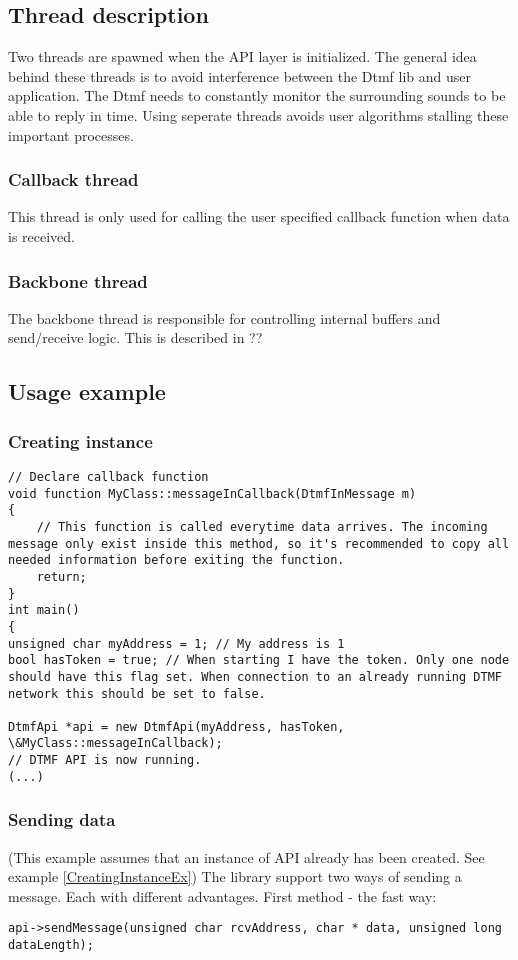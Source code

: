 \subsection{Thread description}
Two threads are spawned when the API layer is initialized. The general idea behind these threads is to avoid interference between the Dtmf lib and user application. The Dtmf needs to constantly monitor the surrounding sounds to be able to reply in time. Using seperate threads avoids user algorithms stalling these important processes.

\subsubsection{Callback thread}
This thread is only used for calling the user specified callback function when data is received. 

\subsubsection{Backbone thread}
The backbone thread is responsible for controlling internal buffers and send/receive logic. This is described in ?? 


\subsection{Usage example}
\subsubsection{Creating instance}
\begin{lstlisting}[caption={Creating instance example},label=CreatingInstanceEx]
// Declare callback function
void function MyClass::messageInCallback(DtmfInMessage m)
{
    // This function is called everytime data arrives. The incoming message only exist inside this method, so it's recommended to copy all needed information before exiting the function.
    return;
}
int main()
{
unsigned char myAddress = 1; // My address is 1
bool hasToken = true; // When starting I have the token. Only one node should have this flag set. When connection to an already running DTMF network this should be set to false.

DtmfApi *api = new DtmfApi(myAddress, hasToken, \&MyClass::messageInCallback);
// DTMF API is now running.
(...)
\end{lstlisting}

\subsubsection{Sending data}
(This example assumes that an instance of API already has been created. See example \ref{CreatingInstanceEx})
The library support two ways of sending a message. Each with different advantages.
First method - the fast way:
\begin{lstlisting}[caption={Sending data example 1},label=SendingDataEx1]
api->sendMessage(unsigned char rcvAddress, char * data, unsigned long dataLength);
\end{lstlisting}

